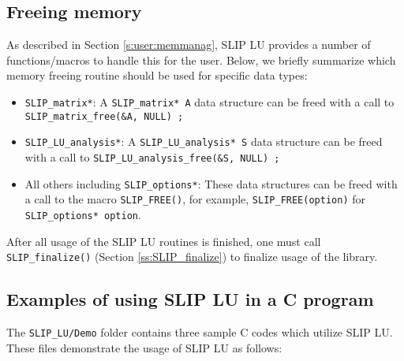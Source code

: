 \documentclass[12pt]{article}
\theoremstyle{definition}
\begin{document}
\cprotect\subsection{Freeing memory}
\label{s:Using:free}

As described in Section \ref{s:user:memmanag}, SLIP LU provides a number
of functions/macros to handle this for the user. Below, we briefly summarize
which memory freeing routine should be used for specific data types:

\begin{itemize}
\item \verb|SLIP_matrix*|: A \verb|SLIP_matrix* A| data structure can be freed
with a call to \verb|SLIP_matrix_free(&A, NULL) ;|

\item \verb|SLIP_LU_analysis*|: A \verb|SLIP_LU_analysis* S| data structure can
be freed with a call to \verb|SLIP_LU_analysis_free(&S, NULL) ;|

\item All others including \verb|SLIP_options*|: These data structures can be
freed with a call to the macro \verb|SLIP_FREE()|, for example,
\verb|SLIP_FREE(option)| for \newline
\verb|SLIP_options* option|.

\end{itemize}

After all usage of the SLIP LU routines is finished, one must call
\verb|SLIP_finalize()| (Section \ref{ss:SLIP_finalize}) to finalize usage of
the library.

\cprotect\subsection{Examples of using SLIP LU in a C program}
\label{s:Using:Examples}

The \verb|SLIP_LU/Demo| folder contains three sample C codes which utilize SLIP
LU. These files demonstrate the usage of SLIP LU as follows:
\end{document}
